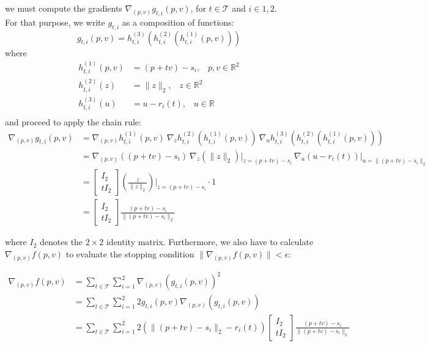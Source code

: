 \documentclass[12pt]{article}
\begin{document}
we must compute the gradients $\nabla_{(p, v)}g_{t, i}(p, v)$, for $t \in \mathcal{T}$ and $i \in {1, 2}$. \\
For that purpose, we write $g_{t, i}$ as a composition of functions:
\[
    g_{t, i}(p, v) = h_{t, i}^{(3)}(h_{t, i}^{(2)}(h_{t, i}^{(1)}(p, v)))
\]
where
\begin{align*}
    h_{t, i}^{(1)}(p, v) &= (p + tv) - s_i, \;\;\; p, v \in \mathbb{R}^2 \\
    h_{t, i}^{(2)}(z) &= \|z\|_2, \;\;\; z \in \mathbb{R}^2 \\
    h_{t, i}^{(3)}(u) &= u - r_i(t), \;\;\; u \in \mathbb{R} \\
\end{align*}
and proceed to apply the chain rule:
\begin{align*}
    \nabla_{(p, v)}g_{t, i}(p, v) &= \nabla_{(p, v)}h_{t, i}^{(1)}(p, v) \:
                                    \nabla_{z} h_{t, i}^{(2)}(h_{t, i}^{(1)}(p, v)) \:
                                    \nabla_{u} h_{t, i}^{(3)}(h_{t, i}^{(2)}(h_{t, i}^{(1)}(p, v))) \\
                                  &= \nabla_{(p, v)}((p + tv) - s_i) \:
                                    \nabla_{z} (\|z\|_2)\bigg\rvert_{z = (p + tv) - s_i} \:
                                    \nabla_{u} (u - r_i(t))\bigg\rvert_{u = \|(p + tv) - s_i\|_2} \\
                                  &= \begin{bmatrix} I_2 \\ tI_2 \end{bmatrix} \left( \frac{z}{\|z\|_2}\right)\bigg\rvert_{z = (p + tv) - s_i} \cdot 1 \\
                                  &= \begin{bmatrix} I_2 \\ tI_2 \end{bmatrix} \frac{(p + tv) - s_i}{\|(p + tv) - s_i\|_2}
\end{align*}         

where $I_2$ denotes the $2 \times 2$ identity matrix.
Furthermore, we also have to calculate $\nabla_{(p, v)}f(p, v)$ to evaluate the stopping condition
$\|\nabla_{(p, v)}f(p, v)\| < \epsilon$:

\begin{align*}
    \nabla_{(p, v)}f(p, v) 
    &= \sum_{t \in \mathcal{T}} \sum_{i = 1}^2 \nabla_{(p, v)}(g_{t, i}(p, v))^2 \\
    &= \sum_{t \in \mathcal{T}} \sum_{i = 1}^2 2g_{t, i}(p, v)\nabla_{(p, v)}(g_{t, i}(p, v)) \\
    &= \sum_{t \in \mathcal{T}} \sum_{i = 1}^2 2(\|(p + tv) - s_i \|_2 - r_i(t))
    \begin{bmatrix} I_2 \\ tI_2 \end{bmatrix} \frac{(p + tv) - s_i}{\|(p + tv) - s_i\|_2}
\end{align*}
\end{document}
